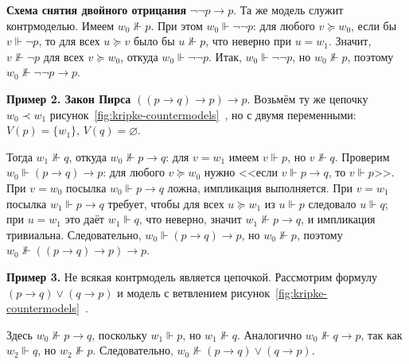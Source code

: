 \documentclass[14pt, russian]{scrartcl}
\begin{document}
\textbf{Схема снятия двойного отрицания} $\neg\neg p \rightarrow p$. Та же модель
служит контрмоделью. Имеем $w_0 \not\Vdash p$. При этом $w_0 \Vdash \neg\neg p$:
для любого $v \succeq w_0$, если бы $v \Vdash \neg p$, то для всех $u \succeq v$
было бы $u \not\Vdash p$, что неверно при $u = w_1$. Значит,
$v \not\Vdash \neg p$ для всех $v \succeq w_0$, откуда $w_0 \Vdash \neg\neg p$.
Итак, $w_0 \Vdash \neg\neg p$, но $w_0 \not\Vdash p$, поэтому
$w_0 \not\Vdash \neg\neg p \rightarrow p$.

\textbf{Пример 2. Закон Пирса} $((p \rightarrow q) \rightarrow p) \rightarrow p$.
Возьмём ту же цепочку $w_0 \prec w_1$ рисунок~\ref{fig:kripke-countermodels}~, но с двумя
переменными: $V(p) = \{w_1\}$, $V(q) = \varnothing$.

Тогда $w_1 \not\Vdash q$, откуда $w_0 \not\Vdash p \rightarrow q$: для
$v = w_1$ имеем $v \Vdash p$, но $v \not\Vdash q$. Проверим
$w_0 \Vdash (p \rightarrow q) \rightarrow p$: для любого $v \succeq w_0$ нужно
<<если $v \Vdash p \rightarrow q$, то $v \Vdash p$>>. При $v = w_0$ посылка
$w_0 \Vdash p \rightarrow q$ ложна, импликация выполняется. При $v = w_1$
посылка $w_1 \Vdash p \rightarrow q$ требует, чтобы для всех $u \succeq w_1$ из
$u \Vdash p$ следовало $u \Vdash q$; при $u = w_1$ это даёт $w_1 \Vdash q$, что
неверно, значит $w_1 \not\Vdash p \rightarrow q$, и импликация тривиальна.
Следовательно, $w_0 \Vdash (p \rightarrow q) \rightarrow p$, но
$w_0 \not\Vdash p$, поэтому
$w_0 \not\Vdash ((p \rightarrow q) \rightarrow p) \rightarrow p$.

\textbf{Пример 3.} Не всякая контрмодель является цепочкой. Рассмотрим формулу
$(p \rightarrow q) \lor (q \rightarrow p)$ и модель с ветвлением
рисунок~\ref{fig:kripke-countermodels}~.

Здесь $w_0 \not\Vdash p \rightarrow q$, поскольку $w_1 \Vdash p$, но
$w_1 \not\Vdash q$. Аналогично $w_0 \not\Vdash q \rightarrow p$, так как
$w_2 \Vdash q$, но $w_2 \not\Vdash p$. Следовательно,
$w_0 \not\Vdash (p \rightarrow q) \lor (q \rightarrow p)$.
\end{document}

